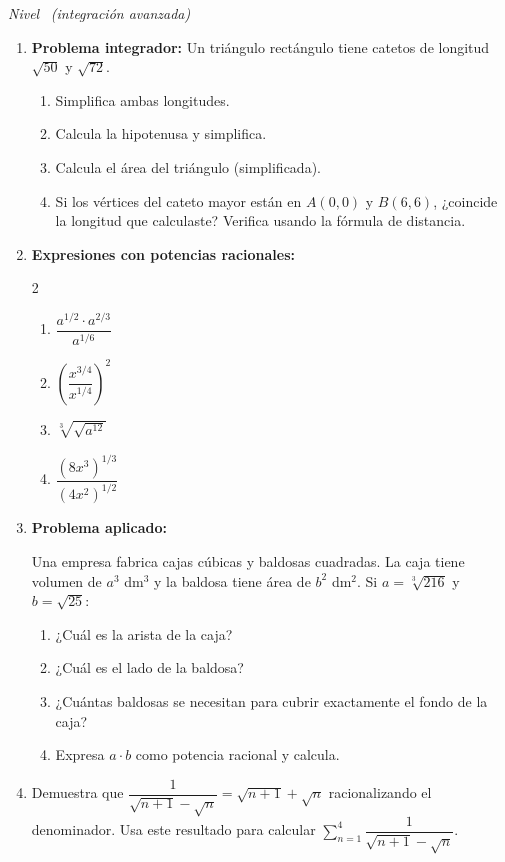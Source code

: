 \documentclass[11pt, letterpaper]{article}
\begin{document}
\textit{Nivel} \bigstar\bigstar\bigstar\ \textit{(integración avanzada)}

\begin{enumerate}[label=\textbf{\arabic*.}, leftmargin=*, resume]

  \item \textbf{Problema integrador:} Un triángulo rectángulo tiene catetos de longitud $\sqrt{50}$ y $\sqrt{72}$.
  \begin{enumerate}[label=\alph*)]
    \item Simplifica ambas longitudes.
    \item Calcula la hipotenusa y simplifica.
    \item Calcula el área del triángulo (simplificada).
    \item Si los vértices del cateto mayor están en $A(0,0)$ y $B(6,6)$, ¿coincide la longitud que calculaste? Verifica usando la fórmula de distancia.
  \end{enumerate}

  \item \textbf{Expresiones con potencias racionales:}
  \begin{multicols}{2}
  \begin{enumerate}[label=\alph*)]
    \item $\dfrac{a^{1/2}\cdot a^{2/3}}{a^{1/6}}$
    \item $\left(\dfrac{x^{3/4}}{x^{1/4}}\right)^2$
    \item $\sqrt[3]{\sqrt{a^{12}}}$
    \item $\dfrac{(8x^3)^{1/3}}{(4x^2)^{1/2}}$
  \end{enumerate}
  \end{multicols}

  \item \textbf{Problema aplicado:}

  Una empresa fabrica cajas cúbicas y baldosas cuadradas. La caja tiene volumen de $a^3$ dm$^3$ y la baldosa tiene área de $b^2$ dm$^2$. Si $a=\sqrt[3]{216}$ y $b=\sqrt{25}$:
  \begin{enumerate}[label=\alph*)]
    \item ¿Cuál es la arista de la caja?
    \item ¿Cuál es el lado de la baldosa?
    \item ¿Cuántas baldosas se necesitan para cubrir exactamente el fondo de la caja?
    \item Expresa $a \cdot b$ como potencia racional y calcula.
  \end{enumerate}

  \item Demuestra que $\dfrac{1}{\sqrt{n+1}-\sqrt{n}} = \sqrt{n+1}+\sqrt{n}$ racionalizando el denominador. Usa este resultado para calcular $\displaystyle\sum_{n=1}^{4}\dfrac{1}{\sqrt{n+1}-\sqrt{n}}$.

\end{enumerate}
\end{document}
